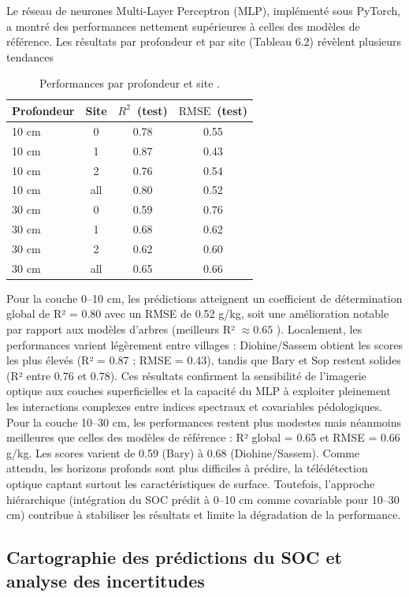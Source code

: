 \documentclass[12pt,a4paper,oneside]{report}
\newcommand{\Rtwo}{\ensuremath{R^2}}
\newcommand{\RMSE}{\ensuremath{\mathrm{RMSE}}}
\begin{document}
Le réseau de neurones Multi-Layer Perceptron (MLP), implémenté sous PyTorch, a montré des performances nettement supérieures à celles des modèles de référence. Les résultats par profondeur et par site (Tableau 6.2) révèlent plusieurs tendances
\begin{table}[h]
\centering
\caption{Performances par profondeur et site .}
\begin{tabular}{lccc}
\toprule
Profondeur & Site & \Rtwo~(test) & \RMSE~(test) \\
\midrule
10 cm & 0 & 0.78 & 0.55 \\
10 cm & 1 & 0.87 & 0.43 \\
10 cm & 2 & 0.76 & 0.54 \\
10 cm & all & 0.80 & 0.52 \\
\midrule
30 cm & 0 & 0.59 & 0.76 \\
30 cm & 1 & 0.68 & 0.62 \\
30 cm & 2 & 0.62 & 0.60 \\
30 cm & all & 0.65 & 0.66 \\
\bottomrule
\end{tabular}
\end{table}
Pour la couche 0–10 cm, les prédictions atteignent un coefficient de détermination global de R² = 0.80 avec un RMSE de 0.52 g/kg, soit une amélioration notable par rapport aux modèles d’arbres (meilleurs R² $\approx 0.65$ ). Localement, les performances varient légèrement entre villages : Diohine/Sassem obtient les scores les plus élevés (R² = 0.87 ; RMSE = 0.43), tandis que Bary et Sop restent solides (R² entre 0.76 et 0.78). Ces résultats confirment la sensibilité de l’imagerie optique aux couches superficielles et la capacité du MLP à exploiter pleinement les interactions complexes entre indices spectraux et covariables pédologiques.
\\
\newline
Pour la couche 10–30 cm, les performances restent plus modestes mais néanmoins meilleures que celles des modèles de référence : R² global = 0.65 et RMSE = 0.66 g/kg. Les scores varient de 0.59 (Bary) à 0.68 (Diohine/Sassem). Comme attendu, les horizons profonds sont plus difficiles à prédire, la télédétection optique captant surtout les caractéristiques de surface. Toutefois, l’approche hiérarchique (intégration du SOC prédit à 0–10 cm comme covariable pour 10–30 cm) contribue à stabiliser les résultats et limite la dégradation de la performance.




\subsection{Cartographie des prédictions du SOC et analyse des incertitudes}
\end{document}
